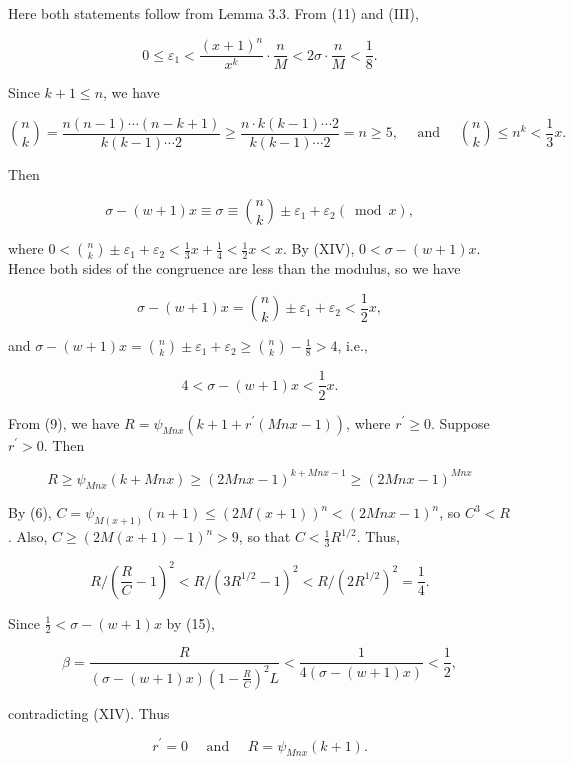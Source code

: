 \documentclass[10pt,letterpaper]{article}
\newcommand{\origpage}[1]{\marginnote{\footnotesize\textbf{[#1]}}}
\begin{document}
Here both statements follow from Lemma 3.3. From (11) and (III),

\[
0 \leq \varepsilon_{1}<\frac{(x+1)^{n}}{x^{k}} \cdot \frac{n}{M}<2 \sigma \cdot \frac{n}{M}<\frac{1}{8} .
\]

Since $k+1 \leq n$, we have

\[
\binom{n}{k}=\frac{n(n-1) \cdots(n-k+1)}{k(k-1) \cdots 2} \geq \frac{n \cdot k(k-1) \cdots 2}{k(k-1) \cdots 2}=n \geq 5, \quad \text { and } \quad\binom{n}{k} \leq n^{k}<\frac{1}{3} x .
\]

Then

\[
\sigma-(w+1) x \equiv \sigma \equiv\binom{n}{k} \pm \varepsilon_{1}+\varepsilon_{2}(\bmod x),
\]

where $0<\binom{n}{k} \pm \varepsilon_{1}+\varepsilon_{2}<\frac{1}{3} x+\frac{1}{4}<\frac{1}{2} x<x$. By (XIV), $0<\sigma-(w+1) x$. Hence both sides of the congruence are less than the modulus, so we have


\begin{equation*}
\sigma-(w+1) x=\binom{n}{k} \pm \varepsilon_{1}+\varepsilon_{2}<\frac{1}{2} x, \tag{14}
\end{equation*}


and $\sigma-(w+1) x=\binom{n}{k} \pm \varepsilon_{1}+\varepsilon_{2} \geq\binom{ n}{k}-\frac{1}{8}>4$, i.e.,


\begin{equation*}
4<\sigma-(w+1) x<\frac{1}{2} x . \tag{15}
\end{equation*}


From (9), we have $R=\psi_{M n x}\left(k+1+r^{\prime}(M n x-1)\right)$, where $r^{\prime} \geq 0$. Suppose $r^{\prime}>0$. Then

\[
R \geq \psi_{M n x}(k+M n x) \geq(2 M n x-1)^{k+M n x-1} \geq(2 M n x-1)^{M n x}
\]

\origpage{459}By (6), $C=\psi_{M(x+1)}(n+1) \leq(2 M(x+1))^{n}<(2 M n x-1)^{n}$, so $C^{3}<R$. Also, $C \geq(2 M(x+1)-1)^{n}>9$, so that $C<\frac{1}{3} R^{1 / 2}$. Thus,

\[
R /\left(\frac{R}{C}-1\right)^{2}<R /\left(3 R^{1 / 2}-1\right)^{2}<R /\left(2 R^{1 / 2}\right)^{2}=\frac{1}{4} .
\]

Since $\frac{1}{2}<\sigma-(w+1) x$ by (15),

\[
\beta=\frac{R}{(\sigma-(w+1) x)\left(1-\frac{R}{C}\right)^{2} L}<\frac{1}{4(\sigma-(w+1) x)}<\frac{1}{2},
\]

contradicting (XIV). Thus


\begin{equation*}
r^{\prime}=0 \quad \text { and } \quad R=\psi_{M n x}(k+1) . \tag{16}
\end{equation*}
\end{document}
